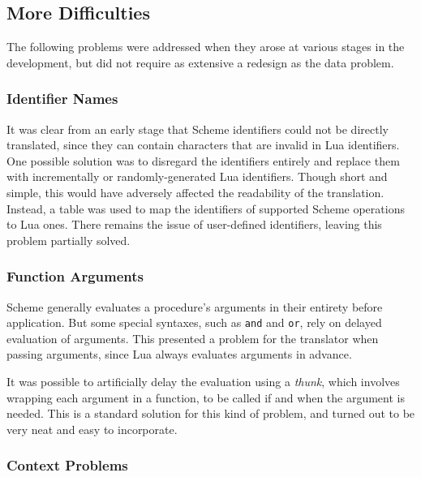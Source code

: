 \subsection{More Difficulties}

The following problems were addressed when they arose at various stages in the
development, but did not require as extensive a redesign as the data problem.

\subsubsection{Identifier Names}\label{sec:identifiers}

It was clear from an early stage that Scheme identifiers could not be directly
translated, since they can contain characters that are invalid in Lua
identifiers. One possible solution was to disregard the identifiers entirely and
replace them with incrementally or randomly-generated Lua identifiers. Though
short and simple, this would have adversely affected the readability of the
translation. Instead, a table was used to map the identifiers of supported
Scheme operations to Lua ones. There remains the issue of user-defined
identifiers, leaving this problem partially solved.

\subsubsection{Function Arguments}

Scheme generally evaluates a procedure's arguments in their entirety before
application. But some special syntaxes, such as \texttt{and} and \texttt{or},
rely on delayed evaluation of arguments. This presented a problem for the
translator when passing arguments, since Lua always evaluates arguments in
advance.

It was possible to artificially delay the evaluation using a \emph{thunk}, which
involves wrapping each argument in a function, to be called if and when the
argument is needed. This is a standard solution for this kind of problem, and
turned out to be very neat and easy to incorporate.

\subsubsection{Context Problems}

